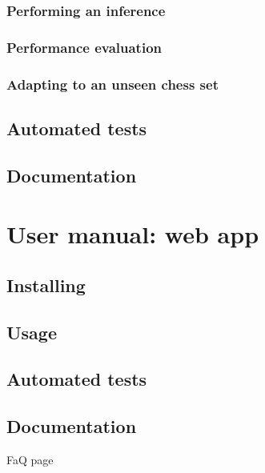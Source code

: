 \documentclass[../../report.tex]{subfiles}
\begin{document}
\subsection{Performing an inference}

\subsection{Performance evaluation}

\subsection{Adapting to an unseen chess set}

\section{Automated tests}
\label{sec:chesscog_tests}

\section{Documentation}
\label{sec:chesscog_documentation}

\chapter{User manual: web app}
\label{chap:user_man_chesscogapp}

\section{Installing}
\section{Usage}
\section{Automated tests}
\label{sec:chesscogapp_tests}
\section{Documentation}
FaQ page
\end{document}
